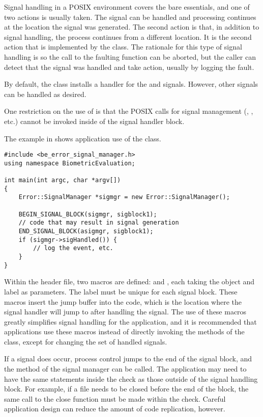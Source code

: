 Signal handling in a POSIX environment covers the bare essentials, and one of
two actions is usually taken. The signal can be handled and processing
continues at the location the signal was generated. The second action is
that, in addition to signal handling, the process continues from a different
location. It is the second action that is implemented by the
 class. The rationale for this type of signal handling is
so the call to the faulting function can be aborted, but the caller can
detect that the signal was handled and take action, usually by logging the
fault.

By default, the  class installs a handler for the
 and  signals. However, other signals can be
handled as desired.

One restriction on the use of  is that the POSIX calls for
signal management (, , etc.) cannot be
invoked inside of the signal handler block.

The example in  shows application use of the
 class.

\begin{lstlisting}[caption={Using the \class{SignalManger}}, label=signalmanageruse]
#include <be_error_signal_manager.h>
using namespace BiometricEvaluation;

int main(int argc, char *argv[])
{
	Error::SignalManager *sigmgr = new Error::SignalManager();

	BEGIN_SIGNAL_BLOCK(sigmgr, sigblock1);
	// code that may result in signal generation
	END_SIGNAL_BLOCK(asigmgr, sigblock1);
	if (sigmgr->sigHandled()) {
		// log the event, etc.
	}
}
\end{lstlisting}

Within the  header file, two macros are defined:
 and , each taking the
 object and label as parameters. The label must be unique
for each signal block. These macros insert the
jump buffer into the code, which is the location where the signal handler will
jump to after handling the signal. The use of these macros greatly simplifies
signal handling for the application, and it is recommended that applications
use these macros instead of directly invoking the methods of the
 class, except for changing the set of handled signals.

If a signal does occur, process control jumps to the end of the signal block,
and the  method of the signal manager can be called. The
application may need to have the same statements inside the  check
as those outside of the signal handling block. For example, if a file needs
to be closed before the end of the block, the same call to the close function
must be made within the  check. Careful application design can
reduce the amount of code replication, however.

